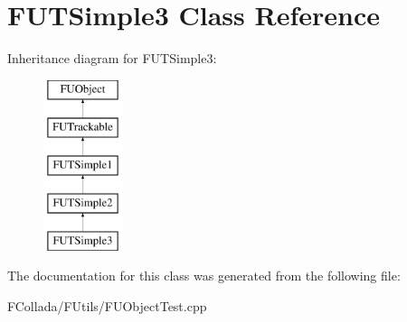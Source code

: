 \hypertarget{classFUTSimple3}{
\section{FUTSimple3 Class Reference}
\label{classFUTSimple3}
}
Inheritance diagram for FUTSimple3:\begin{figure}[H]
\begin{center}
\leavevmode
\includegraphics[height=5.000000cm]{classFUTSimple3}
\end{center}
\end{figure}


The documentation for this class was generated from the following file:\begin{DoxyCompactItemize}
\item 
FCollada/FUtils/FUObjectTest.cpp\end{DoxyCompactItemize}
